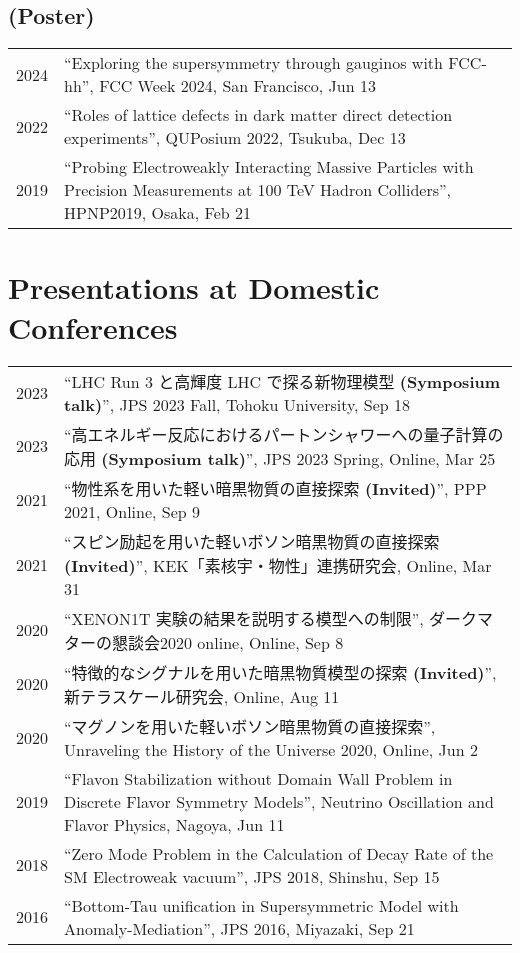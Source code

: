 \documentclass[12pt]{article}
\begin{document}
\subsection*{(Poster)}
\begin{table}[H]\begin{tabular}{lp{6in}}2024 & ``Exploring the supersymmetry through gauginos with FCC-hh'', FCC Week 2024, San Francisco, Jun 13 \\2022 & ``Roles of lattice defects in dark matter direct detection experiments'', QUPosium 2022, Tsukuba, Dec 13 \\2019 & ``Probing Electroweakly Interacting Massive Particles with Precision Measurements at 100 TeV Hadron Colliders'', HPNP2019, Osaka, Feb 21 \\\end{tabular}\end{table}

\section*{Presentations at Domestic Conferences}
\begin{table}[H]\begin{tabular}{lp{6in}}2023 & ``LHC Run 3 と高輝度 LHC で探る新物理模型 \textbf{(Symposium talk)}'', JPS 2023 Fall, Tohoku University, Sep 18 \\2023 & ``高エネルギー反応におけるパートンシャワーへの量子計算の応用 \textbf{(Symposium talk)}'', JPS 2023 Spring, Online, Mar 25 \\2021 & ``物性系を用いた軽い暗黒物質の直接探索 \textbf{(Invited)}'', PPP 2021, Online, Sep 9 \\2021 & ``スピン励起を用いた軽いボソン暗黒物質の直接探索 \textbf{(Invited)}'', KEK「素核宇・物性」連携研究会, Online, Mar 31 \\2020 & ``XENON1T 実験の結果を説明する模型への制限'', ダークマターの懇談会2020 online, Online, Sep 8 \\2020 & ``特徴的なシグナルを用いた暗黒物質模型の探索 \textbf{(Invited)}'', 新テラスケール研究会, Online, Aug 11 \\2020 & ``マグノンを用いた軽いボソン暗黒物質の直接探索'', Unraveling the History of the Universe 2020, Online, Jun 2 \\2019 & ``Flavon Stabilization without Domain Wall Problem in Discrete Flavor Symmetry Models'', Neutrino Oscillation and Flavor Physics, Nagoya, Jun 11 \\2018 & ``Zero Mode Problem in the Calculation of Decay Rate of the SM Electroweak vacuum'', JPS 2018, Shinshu, Sep 15 \\2016 & ``Bottom-Tau unification in Supersymmetric Model with Anomaly-Mediation'', JPS 2016, Miyazaki, Sep 21 \\\end{tabular}\end{table}
\end{document}
